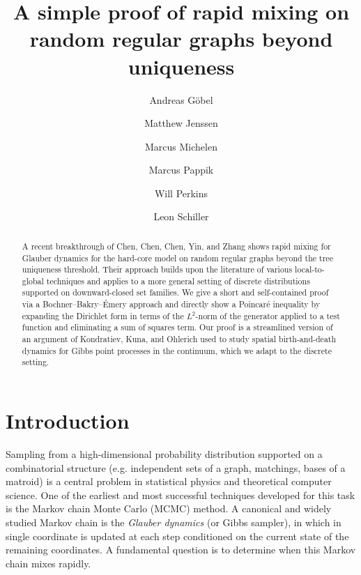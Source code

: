 \documentclass[10pt]{amsart}
\begin{document}
	
	\title{A simple proof of rapid mixing on random regular graphs beyond uniqueness}
	
	\author{Andreas G\"obel}
	\address{Hasso Plattner Institute, University of Potsdam, Germany}
	\author{Matthew Jenssen}
	\address{King's College London, Department of Mathematics}
	\author{Marcus Michelen}
	\address{Northwestern University, Department of Mathematics}
	\author{Marcus Pappik}
	\address{Hasso Plattner Institute, University of Potsdam, Germany}
	\author{Will Perkins}
	\address{Georgia Institute of Technology, School of Computer Science}
	\author{Leon Schiller}
	\address{Hasso Plattner Institute, University of Potsdam, Germany}
	
	\date{}
	
	
	\begin{abstract}
		A recent breakthrough of Chen, Chen, Chen, Yin, and Zhang  shows rapid mixing for Glauber dynamics for the hard-core model on random regular graphs beyond the tree uniqueness threshold.  Their approach builds upon the literature of various local-to-global techniques and applies to a more general setting of 
		discrete distributions 
		supported on downward-closed set families.  We give a short and self-contained proof via a Bochner--Bakry--\'{E}mery approach and directly show a Poincar\'e inequality by expanding the Dirichlet form in terms of the $L^2$-norm of the generator applied to a test function and eliminating a sum of squares term.   Our proof is a streamlined version of an argument of Kondratiev, Kuna, and Ohlerich 
		used to study spatial birth-and-death dynamics for Gibbs 
		point processes in the continuum, which we adapt to the discrete setting.
		
		
	\end{abstract}
	
	\maketitle
	
	\section{Introduction}
	
	Sampling from a high-dimensional probability distribution supported on a combinatorial 
	structure (e.g. independent sets of a graph, matchings, bases of a matroid) is a central problem in statistical physics and theoretical computer science. One of the earliest and most successful techniques developed for this task is the Markov chain Monte Carlo (MCMC) method. 
	A canonical and widely studied Markov chain is the 
	\emph{Glauber dynamics} (or Gibbs sampler), in which in single coordinate is updated at each step conditioned on the current state of the remaining coordinates.  A fundamental question is 
	to determine when this Markov chain mixes rapidly.
	
\end{document}
